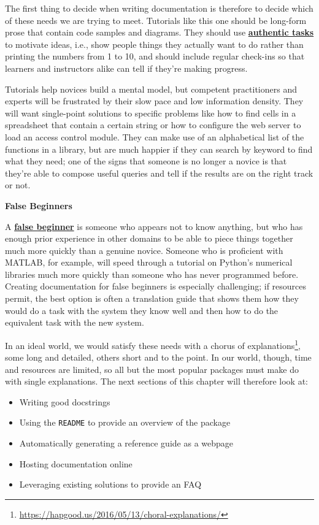 \documentclass[
]{krantz}
\providecommand{\tightlist}{%
  \setlength{\itemsep}{0pt}\setlength{\parskip}{0pt}}
\renewenvironment{quote}{\begin{VF}}{\end{VF}}
\renewcommand{\href}[2]{#2\footnote{\url{#1}}}
\newcommand{\gref}[2]{\hyperlink{#2}{\textbf{#1}}}
\begin{document}
The first thing to decide when writing documentation
is therefore to decide which of these needs we are trying to meet.
Tutorials like this one should be long-form prose that contain code samples and diagrams.
They should use \gref{authentic tasks}{authentic\_task} to motivate ideas,
i.e.,
show people things they actually want to do rather than printing the numbers from 1 to 10,
and should include regular check-ins
so that learners and instructors alike can tell if they're making progress.

Tutorials help novices build a mental model,
but competent practitioners and experts will be frustrated by their slow pace and low information density.
They will want single-point solutions to specific problems like
how to find cells in a spreadsheet that contain a certain string
or how to configure the web server to load an access control module.
They can make use of an alphabetical list of the functions in a library,
but are much happier if they can search by keyword to find what they need;
one of the signs that someone is no longer a novice is that
they're able to compose useful queries and tell if the results are on the right track or not.

\begin{quote}
\textbf{False Beginners}

A \gref{false beginner}{false\_beginner} is someone who appears not to know anything,
but who has enough prior experience in other domains
to be able to piece things together much more quickly than a genuine novice.
Someone who is proficient with MATLAB, for example,
will speed through a tutorial on Python's numerical libraries
much more quickly than someone who has never programmed before.
Creating documentation for false beginners is especially challenging;
if resources permit,
the best option is often a translation guide
that shows them how they would do a task with the system they know well
and then how to do the equivalent task with the new system.
\end{quote}

In an ideal world,
we would satisfy these needs with a \href{https://hapgood.us/2016/05/13/choral-explanations/}{chorus of explanations},
some long and detailed,
others short and to the point.
In our world, though,
time and resources are limited,
so all but the most popular packages must make do with single explanations.
The next sections of this chapter will therefore look at:

\begin{itemize}
\tightlist
\item
  Writing good docstrings
\item
  Using the \texttt{README} to provide an overview of the package
\item
  Automatically generating a reference guide as a webpage
\item
  Hosting documentation online
\item
  Leveraging existing solutions to provide an FAQ
\end{itemize}
\end{document}

